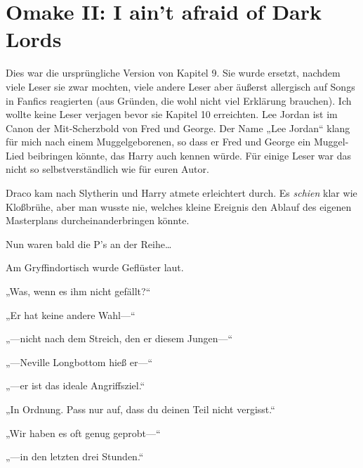 


\section{Omake II: I ain’t afraid of Dark Lords}

Dies war die ursprüngliche Version von Kapitel 9. Sie wurde ersetzt, nachdem viele Leser sie zwar mochten, viele andere Leser aber äußerst allergisch auf Songs in Fanfics reagierten (aus Gründen, die wohl nicht viel Erklärung brauchen). Ich wollte keine Leser verjagen bevor sie Kapitel 10 erreichten.
Lee Jordan ist im Canon der Mit-Scherzbold von Fred und George. Der Name „Lee Jordan“ klang für mich nach einem Muggelgeborenen, so dass er Fred und George ein Muggel-Lied beibringen könnte, das Harry auch kennen würde. Für einige Leser war das nicht so selbstverständlich wie für euren Autor.

\later

Draco kam nach Slytherin und Harry atmete erleichtert durch. Es \emph{schien} klar wie Kloßbrühe, aber man wusste nie, welches kleine Ereignis den Ablauf des eigenen Masterplans durcheinanderbringen könnte.

Nun waren bald die P’s an der Reihe…

Am Gryffindortisch wurde Geflüster laut.
\begin{em}
„Was, wenn es ihm nicht gefällt?“

„Er hat keine andere Wahl—“

„—nicht nach dem Streich, den er diesem Jungen—“

„—Neville Longbottom hieß er—“

„—er ist das ideale Angriffsziel.“

„In Ordnung. Pass nur auf, dass du deinen Teil nicht vergisst.“

„Wir haben es oft genug geprobt—“

„—in den letzten drei Stunden.“
\end{em}

